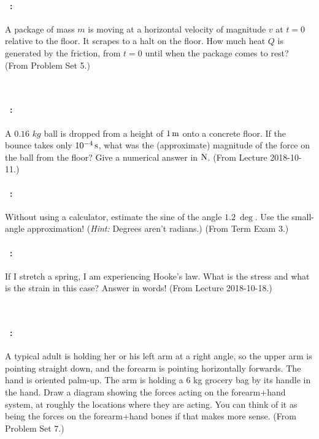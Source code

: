 \documentclass[12pt]{article} 
\begin{document}
\vfill

\paragraph{\problemname~\theproblem:}%
A package of mass $m$ is moving at a horizontal velocity of magnitude $v$ at $t=0$
relative to the floor.  It scrapes to a halt on the floor. How much
heat $Q$ is generated by the friction, from $t=0$ until when the
package comes to rest?
(From Problem Set 5.)

\vfill
~
\clearpage

\paragraph{\problemname~\theproblem:}%
A $0.16\,\,kg$ ball is dropped from a height of $1\,\mathrm{m}$ onto a concrete
floor. If the bounce takes only $10^{-4}\,\mathrm{s}$, what was the (approximate)
magnitude of the force on the ball from the floor? Give a numerical
answer in $\mathrm{N}$.
(From Lecture 2018-10-11.)

\vfill

\paragraph{\problemname~\theproblem:}%
Without using a calculator, estimate the sine of the angle $1.2~\deg$.
Use the small-angle approximation! (\emph{Hint:} Degrees aren't radians.)
(From Term Exam 3.)

\vfill

\paragraph{\problemname~\theproblem:}%
If I stretch a spring, I am experiencing Hooke's law. What is the
stress and what is the strain in this case? Answer in words!
(From Lecture 2018-10-18.)

\vfill
~
\clearpage

\paragraph{\problemname~\theproblem:}%
A typical adult is holding her or his left arm at a right angle, so
the upper arm is pointing straight down, and the forearm is pointing
horizontally forwards. The hand is oriented palm-up. The arm is
holding a 6 kg grocery bag by its handle in the hand. Draw a diagram
showing the forces acting on the forearm+hand system, at roughly the locations
where they are acting. You can think of it as being the forces on the forearm+hand
bones if that makes more sense.
(From Problem Set 7.)
\end{document}
